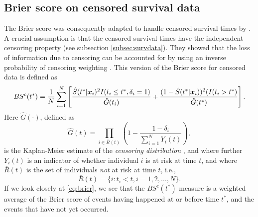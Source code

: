 \subsection{Brier score on censored survival data}
The Brier score was consequently adapted to handle censored survival times by \citet{graf}.
A crucial assumption is that the censored survival times have the independent censoring property (see subsection \ref{subsec:survdata}).
They showed that the loss of information due to censoring can be accounted for by using an inverse probability of censoring weighting \citep{graf}.
This version of the Brier score for censored data is defined as
\begin{equation}\label{eq:brier}
    BS^c(t^*)=\frac{1}{N}\sum_{i=1}^N\left[\frac{\hat{S}(t^*|\bm{x}_i)^2I(t_i\leq t^*,\delta_i=1)}{\hat{G}(t_i)}+\frac{(1-\hat{S}(t^*|\bm{x}_i))^2(I(t_i>t^*)}{\hat{G}(t^*)}\right].
\end{equation}
Here $\hat{G}(\cdot)$, defined as
\begin{equation*}
    \hat{G}(t)=\prod_{i\in \overline{R}(t)}\left(1-\frac{1-\delta_i}{\sum_{i=1}^NY_i(t)}\right),
\end{equation*}
is the Kaplan-Meier estimate of the \textit{censoring distribution} \citep{bovelstadborgan}, and where further $Y_i(t)$ is an indicator of whether individual $i$ is at risk at time $t$, and where $\overline{R}(t)$ is the set of individuals \textit{not} at risk at time $t$, i.e.,
\begin{equation*}
    \overline{R}(t)=\{i\colon t_i<t,i=1,2,\ldots,N\}.
\end{equation*}
If we look closely at \eqref{eq:brier}, we see that the $BS^c(t^*)$ measure is a weighted average of the Brier score of events having happened at or before time $t^*$, and the events that have not yet occurred.


